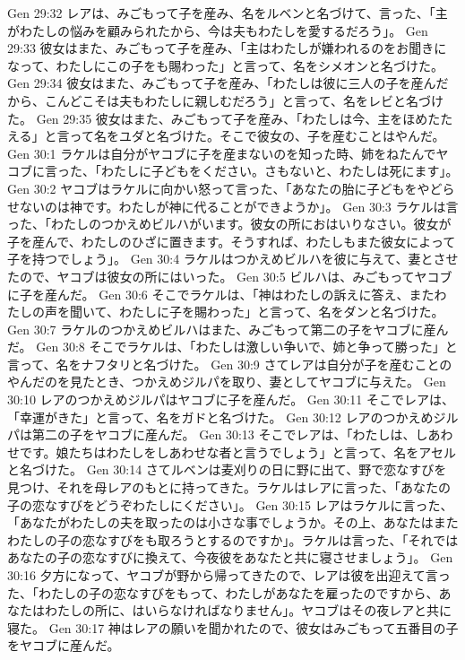 Gen 29:32  レアは、みごもって子を産み、名をルベンと名づけて、言った、「主がわたしの悩みを顧みられたから、今は夫もわたしを愛するだろう」。
Gen 29:33  彼女はまた、みごもって子を産み、「主はわたしが嫌われるのをお聞きになって、わたしにこの子をも賜わった」と言って、名をシメオンと名づけた。
Gen 29:34  彼女はまた、みごもって子を産み、「わたしは彼に三人の子を産んだから、こんどこそは夫もわたしに親しむだろう」と言って、名をレビと名づけた。
Gen 29:35  彼女はまた、みごもって子を産み、「わたしは今、主をほめたたえる」と言って名をユダと名づけた。そこで彼女の、子を産むことはやんだ。
Gen 30:1  ラケルは自分がヤコブに子を産まないのを知った時、姉をねたんでヤコブに言った、「わたしに子どもをください。さもないと、わたしは死にます」。
Gen 30:2  ヤコブはラケルに向かい怒って言った、「あなたの胎に子どもをやどらせないのは神です。わたしが神に代ることができようか」。
Gen 30:3  ラケルは言った、「わたしのつかえめビルハがいます。彼女の所におはいりなさい。彼女が子を産んで、わたしのひざに置きます。そうすれば、わたしもまた彼女によって子を持つでしょう」。
Gen 30:4  ラケルはつかえめビルハを彼に与えて、妻とさせたので、ヤコブは彼女の所にはいった。
Gen 30:5  ビルハは、みごもってヤコブに子を産んだ。
Gen 30:6  そこでラケルは、「神はわたしの訴えに答え、またわたしの声を聞いて、わたしに子を賜わった」と言って、名をダンと名づけた。
Gen 30:7  ラケルのつかえめビルハはまた、みごもって第二の子をヤコブに産んだ。
Gen 30:8  そこでラケルは、「わたしは激しい争いで、姉と争って勝った」と言って、名をナフタリと名づけた。
Gen 30:9  さてレアは自分が子を産むことのやんだのを見たとき、つかえめジルパを取り、妻としてヤコブに与えた。
Gen 30:10  レアのつかえめジルパはヤコブに子を産んだ。
Gen 30:11  そこでレアは、「幸運がきた」と言って、名をガドと名づけた。
Gen 30:12  レアのつかえめジルパは第二の子をヤコブに産んだ。
Gen 30:13  そこでレアは、「わたしは、しあわせです。娘たちはわたしをしあわせな者と言うでしょう」と言って、名をアセルと名づけた。
Gen 30:14  さてルベンは麦刈りの日に野に出て、野で恋なすびを見つけ、それを母レアのもとに持ってきた。ラケルはレアに言った、「あなたの子の恋なすびをどうぞわたしにください」。
Gen 30:15  レアはラケルに言った、「あなたがわたしの夫を取ったのは小さな事でしょうか。その上、あなたはまたわたしの子の恋なすびをも取ろうとするのですか」。ラケルは言った、「それではあなたの子の恋なすびに換えて、今夜彼をあなたと共に寝させましょう」。
Gen 30:16  夕方になって、ヤコブが野から帰ってきたので、レアは彼を出迎えて言った、「わたしの子の恋なすびをもって、わたしがあなたを雇ったのですから、あなたはわたしの所に、はいらなければなりません」。ヤコブはその夜レアと共に寝た。
Gen 30:17  神はレアの願いを聞かれたので、彼女はみごもって五番目の子をヤコブに産んだ。
